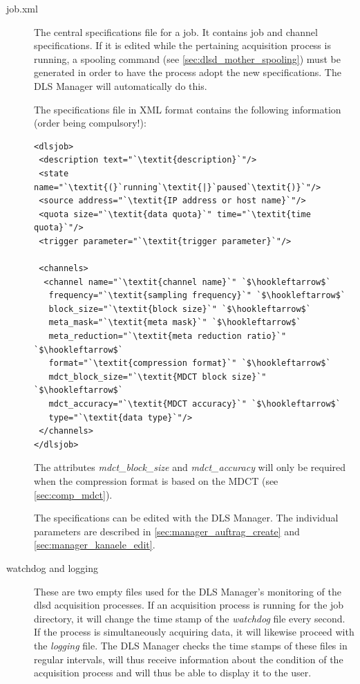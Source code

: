 \documentclass[a4paper,12pt,BCOR6mm,bibtotoc,idxtotoc]{scrbook}
\begin{document}
\begin{description}

\item[job.xml] The central specifications file for a job. It contains job and
channel specifications. If it is edited while the pertaining acquisition
process is running, a spooling command (see
\autoref{sec:dlsd_mother_spooling}) must be generated in order to have the
process adopt the new specifications. The DLS Manager will automatically do
this.

The specifications file in XML format contains the following information (order being compulsory!):

\begin{lstlisting}
<dlsjob>
 <description text="`\textit{description}`"/>
 <state name="`\textit{(}`running`\textit{|}`paused`\textit{)}`"/>
 <source address="`\textit{IP address or host name}`"/>
 <quota size="`\textit{data quota}`" time="`\textit{time quota}`"/>
 <trigger parameter="`\textit{trigger parameter}`"/>

 <channels>
  <channel name="`\textit{channel name}`" `$\hookleftarrow$`
   frequency="`\textit{sampling frequency}`" `$\hookleftarrow$`
   block_size="`\textit{block size}`" `$\hookleftarrow$`
   meta_mask="`\textit{meta mask}`" `$\hookleftarrow$`
   meta_reduction="`\textit{meta reduction ratio}`" `$\hookleftarrow$`
   format="`\textit{compression format}`" `$\hookleftarrow$`
   mdct_block_size="`\textit{MDCT block size}`" `$\hookleftarrow$`
   mdct_accuracy="`\textit{MDCT accuracy}`" `$\hookleftarrow$`
   type="`\textit{data type}`"/>
 </channels>
</dlsjob>
\end{lstlisting}

The attributes \textit{mdct\_block\_size} and \textit{mdct\_accuracy} will
only be required when the compression format is based on the MDCT (see
\autoref{sec:comp_mdct}).

The specifications can be edited with the DLS Manager. The individual
parameters are described in \autoref{sec:manager_auftrag_create} and
\autoref{sec:manager_kanaele_edit}.

\item[watchdog and logging] These are two empty files used for the DLS
Manager’s monitoring of the dlsd acquisition processes. If an acquisition
process is running for the job directory, it will change the time stamp of the
\textit{watchdog} file every second. If the process is simultaneously
acquiring data, it will likewise proceed with the \textit{logging} file. The
DLS Manager checks the time stamps of these files in regular intervals, will
thus receive information about the condition of the acquisition process and
will thus be able to display it to the user.


\end{description}
\end{document}
